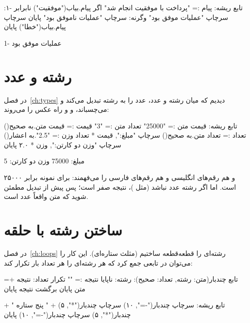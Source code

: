 \begin{salamfa}
تابع ریشه:
    پیام := "پرداخت با موفقیت انجام شد"
    اگر پیام.بیاب("موفقیت") نابرابر -۱:
        سرچاپ "عملیات موفق بود"
    وگرنه:
        سرچاپ "عملیات ناموفق بود"
    پایان
    سرچاپ پیام.بیاب("خطا")
پایان
\end{salamfa}

\begin{outputfa}
عملیات موفق بود
-1
\end{outputfa}

\section{رشته و عدد}

در فصل~\ref{ch:types} دیدیم که \code{+} میان رشته و عدد، عدد را به رشته
تبدیل می‌کند و می‌چسباند، و  و  راه
عکس را می‌روند:

\begin{salamfa}
تابع ریشه:
    قیمت متن := "25000"
    تعداد متن := "3"
    قیمت := قیمت متن.به صحیح()
    تعداد := تعداد متن.به صحیح()
    سرچاپ "مبلغ:", قیمت * تعداد
    وزن := "2.5".به اعشار()
    سرچاپ "وزن دو کارتن:", وزن * ۲.۰
پایان
\end{salamfa}

\begin{outputfa}
مبلغ: 75000
وزن دو کارتن: 5
\end{outputfa}

\begin{warn}
 و  هم رقم‌های انگلیسی و هم رقم‌های فارسی
را می‌فهمند: برای نمونه  برابر ۲۵۰۰۰ است. اما اگر رشته عدد
نباشد (مثل )، نتیجه صفر است؛ پس پیش از تبدیل مطمئن شوید که متن
واقعاً عدد است.
\end{warn}

\section{ساختن رشته با حلقه}

در فصل~\ref{ch:loops} رشته‌ای را قطعه‌قطعه ساختیم (مثلث ستاره‌ای). این کار را
می‌توان در تابعی جمع کرد که هر رشته‌ای را هر تعداد بار تکرار کند:

\begin{salamfa}
تابع چندبار(متن: رشته, تعداد: صحیح): رشته:
    ناپایا نتیجه := ""
    تکرار تعداد:
        نتیجه += متن
    پایان
    برگشت نتیجه
پایان

تابع ریشه:
    سرچاپ چندبار("-=", ۱۰)
    سرچاپ چندبار("*", ۵) + " پنج ستاره " + چندبار("*", ۵)
    سرچاپ چندبار("-=", ۱۰)
پایان
\end{salamfa}

